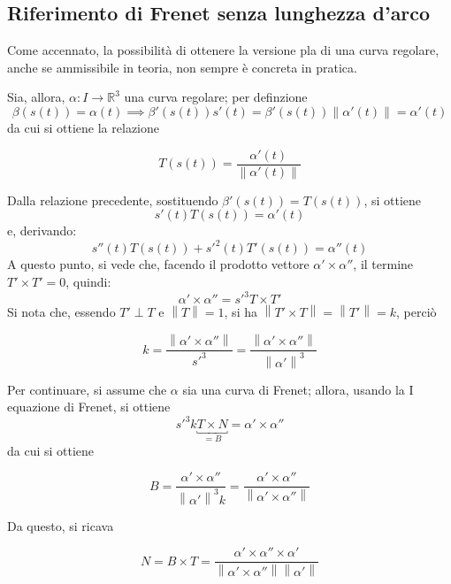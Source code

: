 \documentclass[12pt]{scrartcl}
\theoremstyle{style}
\newenvironment{boxenv}[1][]{
    \begin{eqbox}[#1]
    }{
   \end{eqbox}
}
\numberwithin{equation}{subsection}
\begin{document}
\subsection{Riferimento di Frenet senza lunghezza d'arco}
Come accennato, la possibilit\`a di ottenere la versione pla di una curva regolare, anche se ammissibile in teoria, non sempre \`e concreta in pratica.

Sia, allora, $\alpha : I \to \mathbb{R}^3$ una curva regolare; per definzione
\[
	\beta (s(t))= \alpha (t) \implies \beta '(s(t)) s'(t) = \beta '(s(t)) \left\lVert \alpha '(t) \right\rVert = \alpha '(t)
\] 
da cui si ottiene la relazione
\begin{boxenv}[]
\[
	T(s(t)) = \frac{\alpha '(t)}{\left\lVert \alpha '(t) \right\rVert }
\] 
\end{boxenv}
\noindent Dalla relazione precedente, sostituendo $\beta '(s(t)) = T(s(t))$, si ottiene
\begin{equation}
	s'(t) T(s(t)) = \alpha '(t)
\end{equation}
e, derivando:
\begin{equation}\label{e1}
s'' (t) T(s(t)) + s'^2(t) T'(s(t)) = \alpha ''(t)
\end{equation}
A questo punto, si vede che, facendo il prodotto vettore $\alpha ' \times \alpha ''$, il termine $T' \times T' = 0$, quindi:
\begin{equation}\label{e2}
	\alpha ' \times \alpha '' = s'^3 T\times T'
\end{equation}
Si nota che, essendo $T ' \perp T $ e $\left\lVert T \right\rVert = 1$, si ha $\left\lVert T ' \times T \right\rVert = \left\lVert T' \right\rVert = k$, perci\`o
\begin{boxenv}[]
\[
k = \frac{\left\lVert \alpha '\times \alpha '' \right\rVert }{s'^3}= \frac{\left\lVert \alpha ' \times \alpha ''\right\rVert }{\left\lVert \alpha '\right\rVert ^3}
\] 
\end{boxenv}
\noindent Per continuare, si assume che $\alpha $ sia una curva di Frenet; allora, usando la I equazione di Frenet, si ottiene
\[
	s'^3 k \underbracket{T \times N }_{=B} = \alpha ' \times \alpha ''
\] 
da cui si ottiene
\begin{boxenv}[]
\[
B=\frac{\alpha '\times \alpha ''}{\left\lVert \alpha ' \right\rVert ^3 k} =\frac{\alpha ' \times \alpha ''}{\left\lVert \alpha ' \times \alpha '' \right\rVert }
\] 
\end{boxenv}
\noindent Da questo, si ricava 
\begin{boxenv}[]
\[
N = B \times T = \frac{\alpha ' \times \alpha '' \times \alpha '}{\left\lVert \alpha '\times \alpha '' \right\rVert \left\lVert \alpha ' \right\rVert }
\] 
\end{boxenv}
\end{document}
